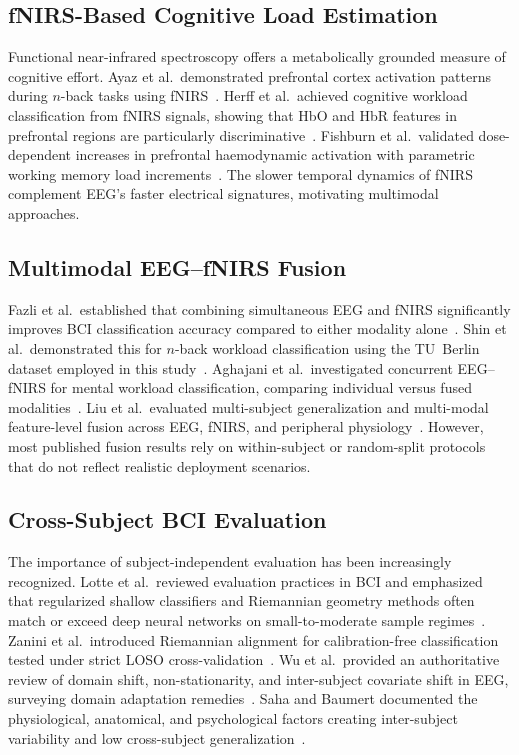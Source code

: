 \documentclass[conference]{IEEEtran}
\begin{document}
\subsection{fNIRS-Based Cognitive Load Estimation}
Functional near-infrared spectroscopy offers a metabolically grounded measure of cognitive effort. Ayaz et al.\ demonstrated prefrontal cortex activation patterns during $n$-back tasks using fNIRS~\cite{ayaz2012optical}. Herff et al.\ achieved cognitive workload classification from fNIRS signals, showing that HbO and HbR features in prefrontal regions are particularly discriminative~\cite{herff2014mental}. Fishburn et al.\ validated dose-dependent increases in prefrontal haemodynamic activation with parametric working memory load increments~\cite{fishburn2014sensitivity}. The slower temporal dynamics of fNIRS complement EEG's faster electrical signatures, motivating multimodal approaches.

\subsection{Multimodal EEG--fNIRS Fusion}
Fazli et al.\ established that combining simultaneous EEG and fNIRS significantly improves BCI classification accuracy compared to either modality alone~\cite{fazli2012enhanced}. Shin et al.\ demonstrated this for $n$-back workload classification using the TU~Berlin dataset employed in this study~\cite{shin2018simultaneous}. Aghajani et al.\ investigated concurrent EEG--fNIRS for mental workload classification, comparing individual versus fused modalities~\cite{aghajani2017measuring}. Liu et al.\ evaluated multi-subject generalization and multi-modal feature-level fusion across EEG, fNIRS, and peripheral physiology~\cite{liu2017multisubject}. However, most published fusion results rely on within-subject or random-split protocols that do not reflect realistic deployment scenarios.

\subsection{Cross-Subject BCI Evaluation}
The importance of subject-independent evaluation has been increasingly recognized. Lotte et al.\ reviewed evaluation practices in BCI and emphasized that regularized shallow classifiers and Riemannian geometry methods often match or exceed deep neural networks on small-to-moderate sample regimes~\cite{lotte2018review}. Zanini et al.\ introduced Riemannian alignment for calibration-free classification tested under strict LOSO cross-validation~\cite{zanini2018transfer}. Wu et al.\ provided an authoritative review of domain shift, non-stationarity, and inter-subject covariate shift in EEG, surveying domain adaptation remedies~\cite{wu2022transfer}. Saha and Baumert documented the physiological, anatomical, and psychological factors creating inter-subject variability and low cross-subject generalization~\cite{saha2020variability}.
\end{document}
